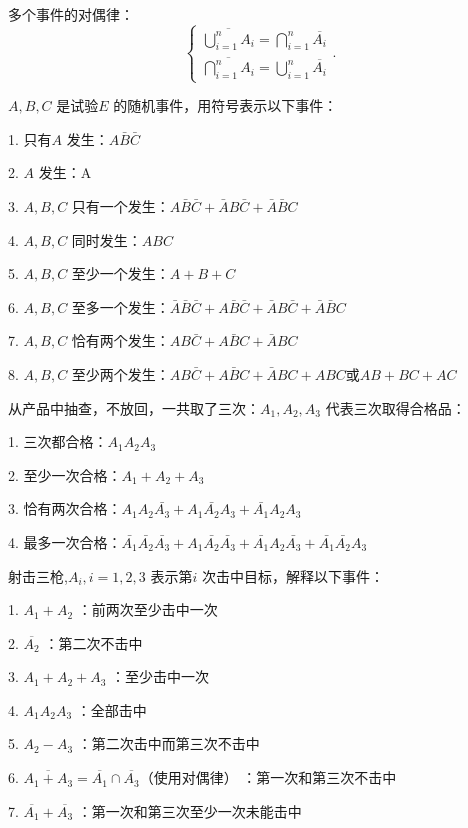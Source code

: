 \begin{notation}
    多个事件的对偶律：
    \[
        \begin{cases}
            \displaystyle{\overline{\bigcup_{i=1}^n A_i}=\bigcap_{i=1}^n \overline{A_i}}\\
            \displaystyle{\overline{\bigcap_{i=1}^n A_i}=\bigcup_{i=1}^{n} \overline{A_i}}
        \end{cases}
    .\] 
\end{notation}
\begin{eg}
    $A,B,C$ 是试验$E$ 的随机事件，用符号表示以下事件：
    
    1. 只有$A$ 发生：$A\bar{B}\bar{C}$

    2. $A$ 发生：A

    3. $A,B,C$ 只有一个发生：$A\bar{B}\bar{C}+\bar{A}B\bar{C}+\bar{A}\bar{B}C$

    4. $A,B,C$ 同时发生：$ABC$ 

    5. $A,B,C$ 至少一个发生：$A+B+C$ 

    6. $A,B,C$ 至多一个发生：$\bar{A}\bar{B}\bar{C}+A\bar{B}\bar{C}+\bar{A}B\bar{C}+\bar{A}\bar{B}C$

    7. $A,B,C$ 恰有两个发生：$AB\bar{C}+A\bar{B}C+\bar{A}BC$

    8. $A,B,C$ 至少两个发生：$AB\bar{C}+A\bar{B}C+\bar{A}BC+ABC$或$AB+BC+AC$
\end{eg}
\begin{eg}
    从产品中抽查，不放回，一共取了三次：$A_1,A_2,A_3$ 代表三次取得合格品：

    1. 三次都合格：$A_1A_2A_3$ 
    
    2. 至少一次合格：$A_1+A_2+A_3$ 

    3. 恰有两次合格：$A_1A_2\bar{A_3}+A_1\bar{A_2}A_3+\bar{A_1}A_2A_3$

    4. 最多一次合格：$\bar{A_1}\bar{A_2}\bar{A_3}+A_1 \bar{A_2}\bar{A_3}+\bar{A_1}A_2 \bar{A_3}+\bar{A_1}\bar{A_2}A_3$
\end{eg}

\begin{eg}
    射击三枪,$A_i,i=1,2,3$ 表示第$i$ 次击中目标，解释以下事件：
    
    1. $A_1+A_2$ ：前两次至少击中一次

    2. $\overline{A_2}$ ：第二次不击中

    3. $A_1+A_2+A_3$ ：至少击中一次

    4. $A_1A_2A_3$ ：全部击中

    5. $A_2-A_3$ ：第二次击中而第三次不击中

    6. $\overline{A_1+A_3}=\overline{A_1}\cap \overline{A_3}$（使用对偶律） ：第一次和第三次不击中

    7. $\overline{A_1}+\overline{A_3}$ ：第一次和第三次至少一次未能击中
\end{eg}

